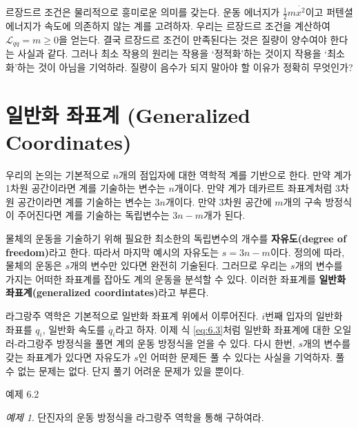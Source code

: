 \documentclass[chapter, oneside, b5paper]{oblivoir}
\theoremstyle{plain}
\theoremstyle{definition}
\theoremstyle{remark}
\newtheorem{example}{예제}[chapter]    %
\begin{document}
르장드르 조건은 물리적으로 흥미로운 의미를 갖는다. 운동 에너지가 $\frac{1}{2}m\dot{x^2}$이고 퍼텐셜 에너지가 속도에 의존하지 않는 계를 고려하자. 우리는 르장드르 조건을 계산하여 $\mathcal{L}_{\dot{q}\dot{q}} = m \geq 0$을 얻는다. 결국 르장드르 조건이 만족된다는 것은 질량이 양수여야 한다는 사실과 같다. 그러나 최소 작용의 원리는 작용을 `정적화'하는 것이지 작용을 `최소화'하는 것이 아님을 기억하라. 질량이 음수가 되지 말아야 할 이유가 정확히 무엇인가?

\section{일반화 좌표계 (Generalized Coordinates)}
우리의 논의는 기본적으로 $n$개의 점입자에 대한 역학적 계를 기반으로 한다. 만약 계가 1차원 공간이라면 계를 기술하는 변수는 $n$개이다. 만약 계가 데카르트 좌표계처럼 3차원 공간이라면 계를 기술하는 변수는 $3n$개이다. 만약 3차원 공간에 $m$개의 구속 방정식이 주어진다면 계를 기술하는 독립변수는 $3n-m$개가 된다.

물체의 운동을 기술하기 위해 필요한 최소한의 독립변수의 개수를 \textbf{자유도(degree of freedom)}라고 한다. 따라서 마지막 예시의 자유도는 $s = 3n-m$이다. 정의에 따라, 물체의 운동은 $s$개의 변수만 있다면 완전히 기술된다. 그러므로 우리는 $s$개의 변수를 가지는 어떠한 좌표계를 잡아도 계의 운동을 분석할 수 있다. 이러한 좌표계를 \textbf{일반화 좌표계(generalized coordintates)}라고 부른다.

라그랑주 역학은 기본적으로 일반화 좌표계 위에서 이루어진다. $i$번째 입자의 일반화 좌표를 $q_i$, 일반화 속도를 $\dot{q_i}$라고 하자. 이제 식 \ref{eq:6.3}처럼 일반화 좌표계에 대한 오일러-라그랑주 방정식을 풀면 계의 운동 방정식을 얻을 수 있다. 다시 한번, $s$개의 변수를 갖는 좌표계가 있다면 자유도가 $s$인 어떠한 문제든 풀 수 있다는 사실을 기억하자. 풀 수 없는 문제는 없다. 단지 풀기 어려운 문제가 있을 뿐이다.

\begin{examplebox}{예제 6.2}
\begin{example}
단진자의 운동 방정식을 라그랑주 역학을 통해 구하여라.
\end{example}
\end{examplebox}
\end{document}
